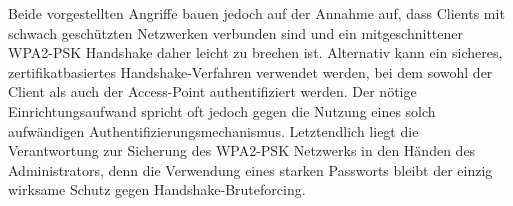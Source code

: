 Beide vorgestellten Angriffe bauen jedoch auf der Annahme auf, dass Clients mit schwach geschützten Netzwerken verbunden sind und ein mitgeschnittener WPA2-PSK Handshake daher leicht zu brechen ist.
Alternativ kann ein sicheres, zertifikatbasiertes Handshake-Verfahren verwendet werden, bei dem sowohl der Client als auch der Access-Point authentifiziert werden.
Der nötige Einrichtungsaufwand spricht oft jedoch gegen die Nutzung eines solch aufwändigen Authentifizierungsmechanismus.
Letztendlich liegt die Verantwortung zur Sicherung des WPA2-PSK Netzwerks in den Händen des Administrators, denn die Verwendung eines starken Passworts bleibt der einzig wirksame Schutz gegen Handshake-Bruteforcing. 


